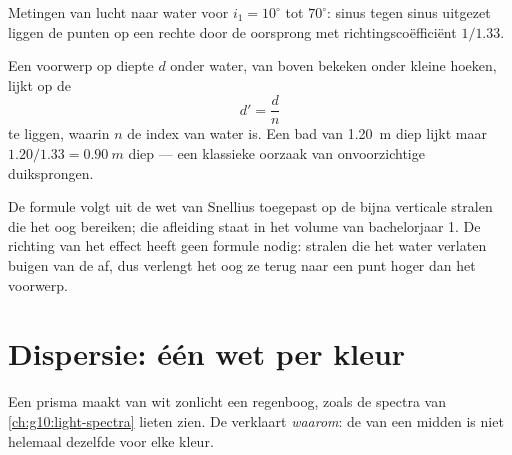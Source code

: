 \begin{omfigure}

{\small Metingen van lucht naar water voor $i_1 = 10^\circ$ tot
$70^\circ$: sinus tegen sinus uitgezet liggen de punten op een rechte
door de oorsprong met richtingscoëfficiënt $1/1.33$.}
\end{omfigure}

\begin{proposition}\label{prop:g10:refraction:depth}
Een voorwerp op diepte $d$ onder water, van boven bekeken onder kleine
hoeken, lijkt op de \emph{}
\[
d' = \frac{d}{n}
\]
te liggen, waarin $n$ de index van water is. Een bad van \qty{1.20}{m}
diep lijkt maar $1.20/1.33 = \qty{0.90}{m}$ diep --- een klassieke
oorzaak van onvoorzichtige duiksprongen.
\end{proposition}
\admitted

\begin{remark}\label{rem:g10:refraction:depthhonest}
De formule volgt uit de wet van Snellius toegepast op de bijna verticale
stralen die het oog bereiken; die afleiding staat in het volume van
bachelorjaar 1. De richting van het effect heeft geen formule nodig:
stralen die het water verlaten buigen van de  af, dus verlengt het
oog ze terug naar een punt hoger dan het voorwerp.
\end{remark}

\section{Dispersie: één wet per kleur}

Een prisma maakt van wit zonlicht een regenboog, zoals de spectra van
\cref{ch:g10:light-spectra} lieten zien. De  verklaart
\emph{waarom}: de  van een midden is niet helemaal
dezelfde voor elke kleur.

